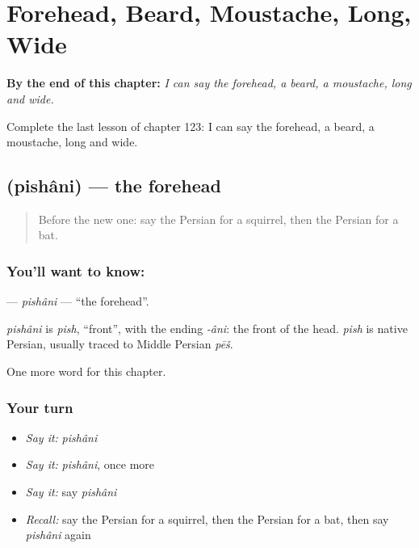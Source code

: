 
\chapter{Forehead, Beard, Moustache, Long, Wide}
\label{ch:fa-forehead-beard-moustache-long-wide}

\begin{chapteropening}
\textbf{By the end of this chapter:} \emph{I can say the forehead, a beard, a moustache, long and wide.}

Complete the last lesson of chapter 123: I can say the forehead, a beard, a moustache, long and wide.
\end{chapteropening}

\section[\texorpdfstring{\fa{پیشانی} (pishâni)}{پیشانی (pishâni)}]{ (pishâni) — the forehead}

\label{lesson:FA-C123-pishani}



\begin{quote}
Before the new one: say the Persian for a squirrel, then the Persian for a bat.
\end{quote}

\subsection*{You'll want to know: }
\textbf{} — \emph{pishâni} — \textquotedblleft{}the forehead\textquotedblright{}.

\begin{cousinweb}
\emph{pishâni} is \emph{pish}, \textquotedblleft{}front\textquotedblright{}, with the ending \emph{-âni}: the front of the head. \emph{pish} is native Persian, usually traced to Middle Persian \emph{pēš}.
\end{cousinweb}

\begin{grammarlens}[title={What you've built}]
One more word for this chapter.
\end{grammarlens}

\subsection*{Your turn}
\begin{itemize}
\raggedright
  \item \emph{Say it:} \emph{pishâni}
  \item \emph{Say it:} \emph{pishâni}, once more
  \item \emph{Say it:} say \emph{pishâni}
  \item \emph{Recall:} say the Persian for a squirrel, then the Persian for a bat, then say \emph{pishâni} again
\end{itemize}

